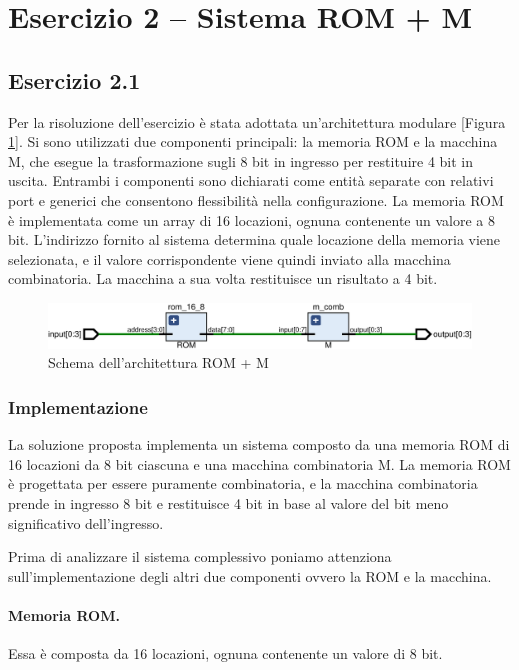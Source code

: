 \section{Esercizio 2 -- Sistema ROM + M}
\subsection{Esercizio 2.1}
Per la risoluzione dell'esercizio è stata adottata un'architettura modulare [Figura \ref{fig:2_1_ROM_M}]. Si sono utilizzati due componenti principali: la memoria ROM e la macchina M, che esegue la trasformazione sugli 8 bit in ingresso per restituire 4 bit in uscita. Entrambi i componenti sono dichiarati come entità separate con relativi port e generici che consentono flessibilità nella configurazione. La memoria ROM è implementata come un array di 16 locazioni, ognuna contenente un valore a 8 bit. L'indirizzo fornito al sistema determina quale locazione della memoria viene selezionata, e il valore corrispondente viene quindi inviato alla macchina combinatoria. La macchina a sua volta restituisce un risultato a 4 bit.

\begin{figure}[h]
    \centering
    \includegraphics[width=0.8\linewidth]{img/2_1_ROM_M.pdf}
    \caption{Schema dell'architettura ROM + M}
    \label{fig:2_1_ROM_M}
\end{figure}

\subsubsection{Implementazione}
La soluzione proposta implementa un sistema composto da una memoria ROM di 16 locazioni da 8 bit ciascuna e una macchina combinatoria M. La memoria ROM è progettata per essere puramente combinatoria, e la macchina combinatoria prende in ingresso 8 bit e restituisce 4 bit in base al valore del bit meno significativo dell'ingresso. 

Prima di analizzare il sistema complessivo poniamo attenziona sull’implementazione degli altri due componenti ovvero la ROM e la macchina.

\paragraph{Memoria ROM.} Essa è composta da 16 locazioni, ognuna contenente un valore di 8 bit. 

